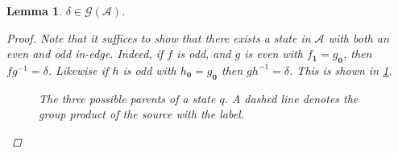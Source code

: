 \documentclass[12pt, letterpaper]{article}
\newcommand{\A}{\mathcal A}
\newcommand{\ch}[1]{\mathbf{#1}}
\newcommand{\res}[2]{{{#1}_{\ch{#2}}}}
\newcommand{\gp}{\mathcal G}
\newtheorem{lemma}[thm]{Lemma}
\begin{document}
\begin{lemma}\label{lemma:delta}
    $\delta \in \gp(\A)$.
    \begin{proof}
        Note that it suffices to show that there exists a state in $\A$ with
        both an even and odd in-edge. Indeed, if $f$ is odd, and $g$ is even
        with $\res{f}{1} = \res{g}{0}$, then $fg^{-1} = \delta$.  Likewise if
        $h$ is odd with $\res{h}{0} = \res{g}{0}$ then $gh^{-1} = \delta$.
        This is shown in \cref{fig:delta-diagram}.
        \begin{figure}[h]
            \centering
            \caption{The three possible parents of a state $q$.
            A dashed line denotes the group product of the source with the
            label.}
            \label{fig:delta-diagram}
        \end{figure}


\end{proof}
\end{lemma}
\end{document}
